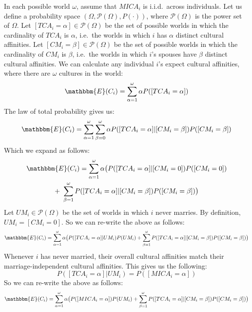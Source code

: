 In each possible world $\omega$, assume that $MICA_{i}$ is i.i.d.\ across individuals. Let us define a probability space $(\Omega,\mathcal{P}(\Omega),P(\cdot))$, where $\mathcal{P}(\Omega)$ is the power set of $\Omega$. Let $[TCA_{i}=\alpha]\in\mathcal{P}(\Omega)$ be the set of possible worlds in which the cardinality of $TCA_{i}$ is $\alpha$, i.e.\ the worlds in which $i$ has $\alpha$ distinct cultural affinities. Let $[CM_{i}=\beta]\in\mathcal{P}(\Omega)$ be the set of possible worlds in which the cardinality of $CM_{i}$ is $\beta$, i.e.\ the worlds in which $i$'s spouses have $\beta$ distinct cultural affinities. We can calculate any individual $i$'s expect cultural affinities, where there are $\omega$ cultures in the world:
\begin{equation}
    \mathbbm{E}(C_{i})=\sum_{\alpha=1}^{\omega}\alpha P([TCA_{i}=\alpha])
\end{equation}
The law of total probability gives us:
\begin{equation}
    \mathbbm{E}(C_{i}) =  \sum_{\alpha=1}^{\omega}\sum_{\beta=0}^{\omega}\alpha P([TCA_{i}=\alpha]|[CM_{i}=\beta])P([CM_{i}=\beta])
\end{equation}
Which we expand as follows:
\begin{multline}
    \mathbbm{E}(C_{i})= \sum_{\alpha=1}^{\omega}\alpha\big(P([TCA_{i}=\alpha]|[CM_{i}=0])P([CM_{i}=0]) \\ + \  \sum_{\beta=1}^{\omega} P([TCA_{i}=\alpha]|[CM_{i}=\beta])P([CM_{i}=\beta])\big)
\end{multline}
Let $UM_{i}\in\mathcal{P}(\Omega)$ be the set of worlds in which $i$ never marries. By definition, $UM_{i}=[CM_{i}=0]$. So we can re-write the above as follows:
\begin{equation}
    \mathbbm{E}(C_{i})=\sum_{\alpha=1}^{\omega}\alpha\big(P([TCA_{i}=\alpha]|UM_{i})P(UM_{i}) +  \sum_{\beta=1}^{\omega} P([TCA_{i}=\alpha]|[CM_{i}=\beta])P([CM_{i}=\beta])\big)
\end{equation}
Whenever $i$ has never married, their overall cultural affinities match their marriage-independent cultural affinities. This gives us the following:
\begin{equation}
    P([TCA_{i}=\alpha]|UM_{i})=P([MICA_{i}=\alpha])
\end{equation}
So we can re-write the above as follows:
\begin{equation}
    \mathbbm{E}(C_{i})=\sum_{\alpha=1}^{\omega}\alpha\big(P([MICA_{i}=\alpha])P(UM_{i}) + \sum_{\beta=1}^{\omega} P([TCA_{i}=\alpha]|[CM_{i}=\beta])P([CM_{i}=\beta])\big)
\end{equation}
